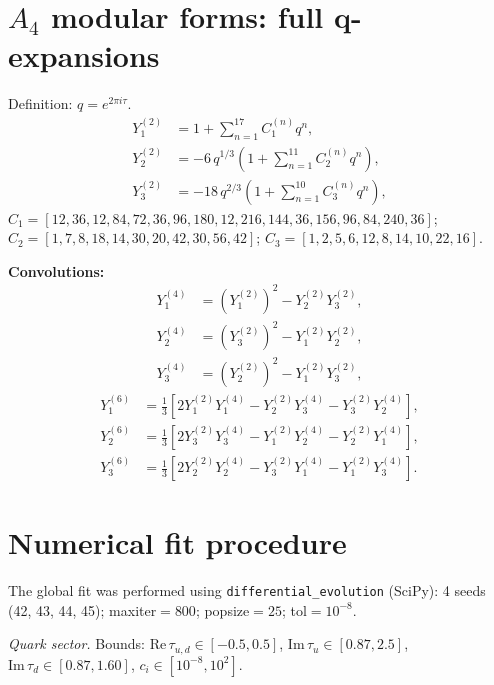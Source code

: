 \documentclass[12pt,a4paper]{article}
\numberwithin{equation}{section}
\begin{document}
\appendix
\newpage

\section{\(A_4\) modular forms: full q-expansions}
Definition: \(q = e^{2\pi i\tau}\).
\begin{align}
Y_1^{(2)} &= 1 + \sum_{n=1}^{17} C_1^{(n)} q^n, \\
Y_2^{(2)} &= -6\, q^{1/3}\left(1 + \sum_{n=1}^{11} C_2^{(n)} q^n\right), \\
Y_3^{(2)} &= -18\, q^{2/3}\left(1 + \sum_{n=1}^{10} C_3^{(n)} q^n\right),
\end{align}
\(C_1 = [12, 36, 12, 84, 72, 36, 96, 180, 12, 216, 144, 36, 156, 96, 84, 240, 36]\);
\(C_2 = [1, 7, 8, 18, 14, 30, 20, 42, 30, 56, 42]\);
\(C_3 = [1, 2, 5, 6, 12, 8, 14, 10, 22, 16]\).

\textbf{Convolutions:}
\begin{align}
Y_1^{(4)} &= (Y_1^{(2)})^2 - Y_2^{(2)} Y_3^{(2)}, \\
Y_2^{(4)} &= (Y_3^{(2)})^2 - Y_1^{(2)} Y_2^{(2)}, \\
Y_3^{(4)} &= (Y_2^{(2)})^2 - Y_1^{(2)} Y_3^{(2)},
\end{align}
\begin{align}
Y_1^{(6)} &= \tfrac13\left[2 Y_1^{(2)} Y_1^{(4)} - Y_2^{(2)} Y_3^{(4)} - Y_3^{(2)} Y_2^{(4)}\right], \\
Y_2^{(6)} &= \tfrac13\left[2 Y_3^{(2)} Y_3^{(4)} - Y_1^{(2)} Y_2^{(4)} - Y_2^{(2)} Y_1^{(4)}\right], \\
Y_3^{(6)} &= \tfrac13\left[2 Y_2^{(2)} Y_2^{(4)} - Y_3^{(2)} Y_1^{(4)} - Y_1^{(2)} Y_3^{(4)}\right].
\end{align}

\section{Numerical fit procedure}
The global fit was performed using \texttt{differential\_evolution} (SciPy):
4 seeds (42, 43, 44, 45); maxiter$=800$; popsize$=25$; tol$=10^{-8}$.

\emph{Quark sector.} Bounds:
\(\mathrm{Re}\,\tau_{u,d} \in [-0.5, 0.5]\),
\(\mathrm{Im}\,\tau_u \in [0.87, 2.5]\),
\(\mathrm{Im}\,\tau_d \in [0.87, 1.60]\),
\(c_i \in [10^{-8}, 10^2]\).
\end{document}
